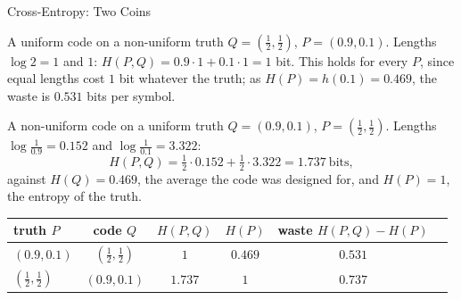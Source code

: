 \begin{frame}{Cross-Entropy: Two Coins}
  \small
  \begin{exampleblock}{A uniform code on a non-uniform truth}
    $Q=(\tfrac12,\tfrac12)$, $P=(0.9,0.1)$. Lengths $\log2=1$ and $1$:
    $H(P,Q)=0.9\cdot1+0.1\cdot1=1$ bit. This holds for every $P$, since equal lengths cost $1$ bit whatever the truth; as $H(P)=h(0.1)=0.469$, the waste is $0.531$ bits per symbol.
  \end{exampleblock}
  \begin{exampleblock}{A non-uniform code on a uniform truth}
    $Q=(0.9,0.1)$, $P=(\tfrac12,\tfrac12)$. Lengths $\log\frac1{0.9}=0.152$ and $\log\frac1{0.1}=3.322$:
    \[
      H(P,Q)=\tfrac12\cdot0.152+\tfrac12\cdot3.322=1.737\ \text{bits},
    \]
    against $H(Q)=0.469$, the average the code was designed for, and $H(P)=1$, the entropy of the truth.
  \end{exampleblock}
  \begin{center}
    \renewcommand{\arraystretch}{1.2}
    \begin{tabular}{@{}lccccc@{}}
      \toprule
      truth $P$ & code $Q$ & $H(P,Q)$ & $H(P)$ & waste $H(P,Q)-H(P)$ \\
      \midrule
      $(0.9,0.1)$ & $(\tfrac12,\tfrac12)$ & $1$ & $0.469$ & $0.531$ \\
      $(\tfrac12,\tfrac12)$ & $(0.9,0.1)$ & $1.737$ & $1$ & $0.737$ \\
      \bottomrule
    \end{tabular}
  \end{center}
\end{frame}


